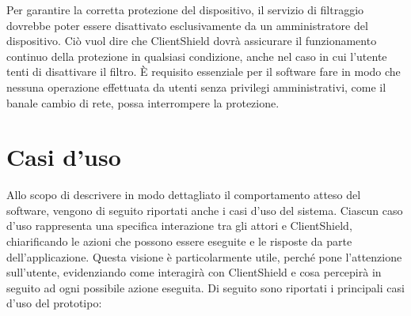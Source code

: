\documentclass[12pt,a4paper,openright,twoside]{book}
\begin{document}
Per garantire la corretta protezione del dispositivo, il servizio di filtraggio dovrebbe poter essere disattivato esclusivamente da un amministratore del dispositivo.
Ciò vuol dire che ClientShield dovrà assicurare il funzionamento continuo della protezione in qualsiasi condizione, anche nel caso in cui l'utente tenti di disattivare il filtro.
È requisito essenziale per il software fare in modo che nessuna operazione effettuata da utenti senza privilegi amministrativi, come il banale cambio di rete, possa interrompere la protezione.

\section{Casi d'uso}
\label{sec:casi-d-uso}

Allo scopo di descrivere in modo dettagliato il comportamento atteso del software, vengono di seguito riportati anche i casi d'uso del sistema.
Ciascun caso d'uso rappresenta una specifica interazione tra gli attori e ClientShield, chiarificando le azioni che possono essere eseguite e le risposte da parte dell'applicazione.
Questa visione è particolarmente utile, perché pone l'attenzione sull'utente, evidenziando come interagirà con ClientShield e cosa percepirà in seguito ad ogni possibile azione eseguita.
Di seguito sono riportati i principali casi d'uso del prototipo:
\end{document}
